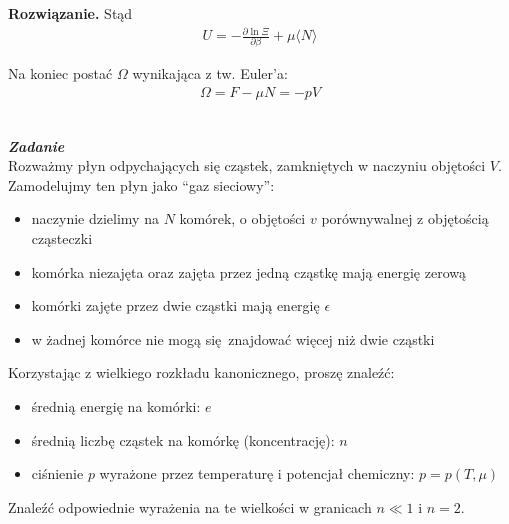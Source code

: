 \documentclass[11pt,a4paper]{article}
\newcounter{zadanie}\newcommand{\zadanie}[1][]{\addtocounter{zadanie}{1} ~\\ {\bf \emph{Zadanie \arabic{zadanie} #1 }} \\}
\newenvironment{solution}{\vspace{1cm} \par\textbf{Rozwiązanie.} \vspace{1cm}}{}
\begin{document}
\begin{solution}
Stąd \begin{align*}
  U = - \frac{\partial \ln \Xi}{\partial \beta} + \mu \langle N \rangle 
\end{align*}

Na koniec postać $\Omega$ wynikająca z tw. Euler'a:
\begin{align*}
  \Omega = F - \mu N = -pV
\end{align*}

\newpage
\end{solution}

\zadanie[]

Rozważmy płyn odpychających się cząstek, zamkniętych w naczyniu objętości $V$.
Zamodelujmy ten płyn jako ``gaz sieciowy'':
\begin{itemize}
\item naczynie dzielimy na $N$ komórek, o objętości $v$ 
      porównywalnej z objętością cząsteczki
\item komórka niezajęta oraz zajęta przez jedną cząstkę mają energię zerową
\item komórki zajęte przez dwie cząstki mają energię $\epsilon$
\item w żadnej komórce nie mogą się znajdować więcej niż dwie cząstki
\end{itemize}

\vskip 0.2cm

Korzystając z wielkiego rozkładu kanonicznego, proszę znaleźć:
\begin{itemize}
\item średnią energię na komórki: $e$
\item średnią liczbę cząstek na komórkę (koncentrację): $n$
\item ciśnienie $p$ wyrażone przez temperaturę i potencjał chemiczny: $p = p(T, \mu)$
\end{itemize}

\vskip 0.2cm

Znaleźć odpowiednie wyrażenia na te wielkości w granicach $n \ll 1$ i  $n=2$.
\end{document}
